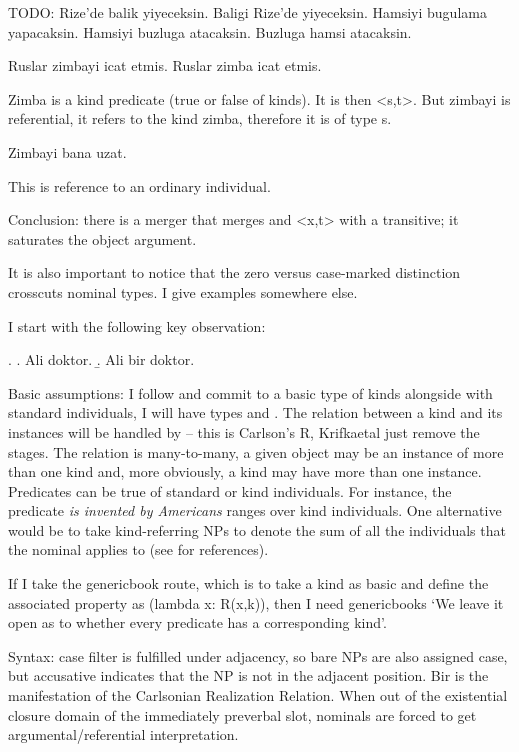 \documentclass[11pt,a4paper]{article}
\begin{document}
TODO: 
Rize'de balik yiyeceksin.
Baligi Rize'de yiyeceksin. 
Hamsiyi bugulama yapacaksin.
Hamsiyi buzluga atacaksin. 
Buzluga hamsi atacaksin.

Ruslar zimbayi icat etmis.
Ruslar zimba icat etmis.

Zimba is a kind predicate (true or false of kinds). It is then <s,t>. But zimbayi is referential, it refers to the kind zimba, therefore it is of type s.

Zimbayi bana uzat.

This is reference to an ordinary individual.

Conclusion: there is a merger that merges and <x,t> with a transitive; it saturates the object argument.


It is also important to notice that the zero versus case-marked distinction crosscuts nominal types. I give examples somewhere else.

I start with the following key observation:

\ex.\label{ex:doktor} 
\a. Ali doktor.
\b. Ali bir doktor.

Basic assumptions: I follow \cite[p.\ 64]{krifkaetal95} and commit to a basic type of kinds alongside with standard individuals, I will have types  and . The relation between a kind and its instances will be handled by  -- this is Carlson's R, Krifkaetal just remove the stages. The relation is many-to-many, a given object may be an instance of more than one kind and, more obviously, a kind may have more than one instance. Predicates can be true of standard or kind individuals. For instance, the predicate \textit{is invented by Americans} ranges over kind individuals. One alternative would be to take kind-referring NPs to denote the sum of all the individuals that the nominal applies to (see \cite{krifkaetal95} for references).

If I take the genericbook route, which is to take a kind as basic and define the associated property as (lambda x: R(x,k)), then I need genericbooks `We leave it open as to whether every predicate has a corresponding kind'.

Syntax: case filter is fulfilled under adjacency, so bare NPs are also assigned case, but accusative indicates that the NP is not in the adjacent position. Bir is the manifestation of the Carlsonian Realization Relation. When out of the existential closure domain of the immediately preverbal slot, nominals are forced to get argumental/referential interpretation.

\begin{comment}
Krifkaetal
* p87 incorporation and kind-reference.
\end{comment}
\end{document}
